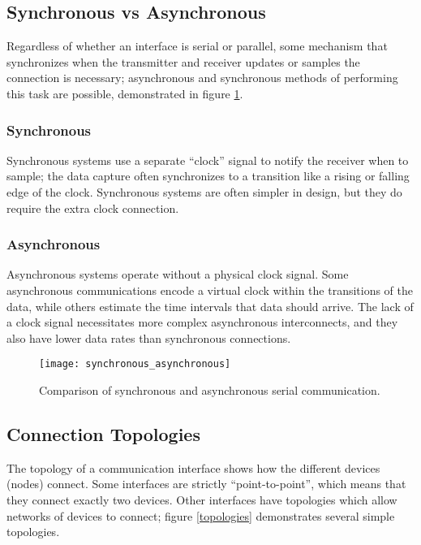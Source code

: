\documentclass[openany,11pt,fleqn]{book} %
\begin{document}
\subsection{Synchronous vs Asynchronous}

Regardless of whether an interface is serial or parallel, some mechanism that synchronizes when the transmitter and receiver updates or samples the connection is necessary; asynchronous and synchronous methods of performing this task are possible, demonstrated in figure \ref{synchronous_asynchronous}.

\subsubsection{Synchronous} 
Synchronous systems use a separate ``clock'' signal to notify the receiver when to sample; the data capture often synchronizes to a transition like a rising or falling edge of the clock. Synchronous systems are often simpler in design, but they do require the extra clock connection.

\subsubsection{Asynchronous}
Asynchronous systems operate without a physical clock signal. Some asynchronous communications encode a virtual clock within the transitions of the data, while others estimate the time intervals that data should arrive. The lack of a clock signal necessitates more complex asynchronous interconnects, and they also have lower data rates than synchronous connections.  

\begin{figure}[]
    \centering\texttt{[image: synchronous\_asynchronous]}
    \caption{Comparison of synchronous and asynchronous serial communication.}
    \label{synchronous_asynchronous}
\end{figure}

\subsection{Connection Topologies} 
The topology of a communication interface shows how the different devices (nodes) connect. Some interfaces are strictly ``point-to-point'', which means that they connect exactly two devices. Other interfaces have topologies which allow networks of devices to connect; figure \ref{topologies} demonstrates several simple topologies. 
\end{document}
